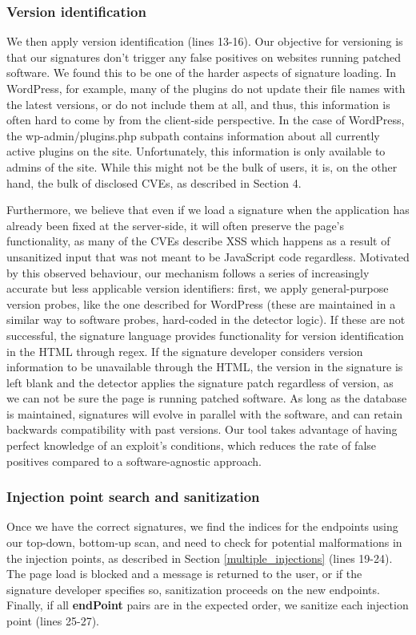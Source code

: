\subsubsection{Version identification}
We then apply version identification (lines 13-16). Our objective for versioning is that our signatures don't trigger any false positives on websites running patched software. We found this to be one of the harder aspects of signature loading. In WordPress, for example, many of the plugins do not update their file names with the latest versions, or do not include them at all, and thus, this information is often hard to come by from the client-side perspective. In the case of WordPress, the wp-admin/plugins.php subpath contains information about all currently active plugins on the site. Unfortunately, this information is only available to admins of the site. While this might not be the bulk of users, it is, on the other hand, the bulk of disclosed CVEs, as described in Section 4.

 Furthermore, we believe that even if we load a signature when the application has already been fixed at the server-side, it will often preserve the page's functionality, as many of the CVEs describe XSS which happens as a result of unsanitized input that was not meant to be JavaScript code regardless. Motivated by this observed behaviour, our mechanism follows a series of increasingly accurate but less applicable version identifiers: first, we apply general-purpose version probes, like the one described for WordPress (these are maintained in a similar way to software probes, hard-coded in the detector logic). If these are not successful, the signature language provides functionality for version identification in the HTML through regex. If the signature developer considers version information to be unavailable through the HTML, the version in the signature is left blank and the detector applies the signature patch regardless of version, as we can not be sure the page is running patched software. As long as the database is maintained, signatures will evolve in parallel with the software, and can retain backwards compatibility with past versions. Our tool takes advantage of having perfect knowledge of an exploit's conditions, which reduces the rate of false positives compared to a software-agnostic approach.
 
\subsubsection{Injection point search and sanitization}
Once we have the correct signatures, we find the indices for the endpoints using our top-down, bottom-up scan, and need to check for potential malformations in the injection points, as described in Section \ref{multiple_injections} (lines 19-24). The page load is blocked and a message is returned to the user, or if the signature developer specifies so, sanitization proceeds on the new endpoints. Finally, if all \textbf{endPoint} pairs are in the expected order, we sanitize each injection point (lines 25-27).


